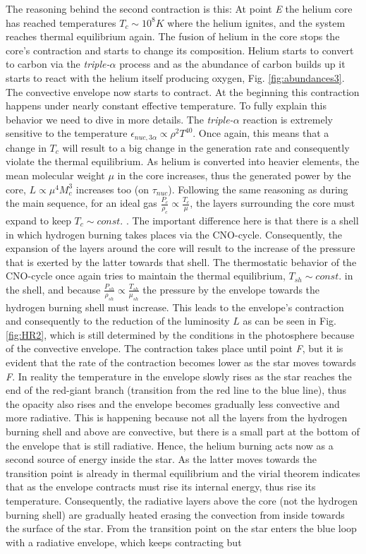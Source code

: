 \documentclass{article}
\begin{document}
\begin{enumerate}
    The reasoning behind the second contraction is this: At point {\it E} the helium core has reached temperatures $T_c \sim 10^8 K$ where the helium ignites, and  the system reaches thermal equilibrium again. The fusion of helium in the core stops the core's contraction and starts to change its composition. Helium starts to convert to carbon via the {\it triple-$\alpha$} process and as the abundance of carbon builds up it starts to react with the helium itself producing oxygen,  Fig. \ref{fig:abundances3}. The convective envelope now starts to contract. At the beginning this contraction happens under nearly constant effective temperature. To fully explain this behavior we need to dive in more details. The {\it triple-$\alpha$} reaction is extremely sensitive to the temperature $\epsilon_{nuc,3\alpha} \propto \rho^2 T^{40}$. Once again, this means that a change in $T_c$ will result to a big change in the generation rate and consequently violate the thermal equilibrium. As helium is converted into heavier elements, the mean molecular weight $\mu$ in the core increases, thus the generated power by the core, $L \propto \mu^4 M_c^{3}$ increases too (on $\tau_{nuc}$). Following the same reasoning as during the main sequence, for an ideal gas $\frac{P_c}{\rho_c} \propto \frac{T_c}{\mu}$, the layers surrounding the core must expand to keep $T_c \sim const.$ . The important difference here is that there is a shell in which hydrogen burning takes places via the CNO-cycle. Consequently, the expansion of the layers around the core will result to the increase of the pressure that is exerted by the latter towards that shell. The thermostatic behavior of the CNO-cycle once again tries to maintain the thermal equilibrium, $T_{sh} \sim const.$ in the shell, and because $\frac{P_{sh}}{\rho_{sh}} \propto \frac{T_{sh}}{\mu_{sh}}$ the pressure by the envelope towards the hydrogen burning shell must increase. This leads to the envelope's contraction and consequently to the reduction of the luminosity $L$ as can be seen in Fig. \ref{fig:HR2}, which is still determined by the conditions in the photosphere because of the convective envelope. The contraction takes place until point {\it F}, but it is evident that the rate of the contraction becomes lower as the star moves towards {\it F}. In reality the temperature in the envelope slowly rises as the star reaches the end of the red-giant branch (transition from the red line to the blue line), thus the opacity also rises and the envelope becomes gradually less convective and more radiative. This is happening because not all the layers from the hydrogen burning shell and above are convective, but there is a small part at the bottom of the envelope that is still radiative. Hence, the helium burning acts now as a second source of energy inside the star. As the latter moves towards the transition point is already in thermal equilibrium and the virial theorem indicates that as the envelope contracts must rise its internal energy, thus rise its temperature. Consequently, the radiative layers above the core (not the hydrogen burning shell) are gradually heated erasing the convection from inside towards the surface of the star. From the transition point on the star enters the blue loop with a radiative envelope, which keeps contracting but 
\end{enumerate}
\end{document}

